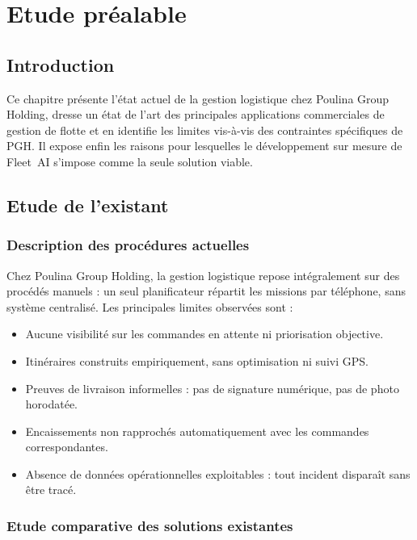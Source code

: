 \chapter{Etude préalable}

\section*{Introduction}
Ce chapitre présente l'état actuel de la gestion logistique chez Poulina Group Holding, dresse un état de l'art des principales applications commerciales de gestion de flotte et en identifie les limites vis-à-vis des contraintes spécifiques de PGH. Il expose enfin les raisons pour lesquelles le développement sur mesure de Fleet~AI s'impose comme la seule solution viable.

\section{Etude de l'existant}

\subsection{Description des procédures actuelles}

Chez Poulina Group Holding, la gestion logistique repose intégralement sur des procédés manuels : un seul planificateur répartit les missions par téléphone, sans système centralisé. Les principales limites observées sont :

\begin{itemize}
  \item Aucune visibilité sur les commandes en attente ni priorisation objective.
  \item Itinéraires construits empiriquement, sans optimisation ni suivi GPS.
  \item Preuves de livraison informelles : pas de signature numérique, pas de photo horodatée.
  \item Encaissements non rapprochés automatiquement avec les commandes correspondantes.
  \item Absence de données opérationnelles exploitables : tout incident disparaît sans être tracé.
\end{itemize}

\subsection{Etude comparative des solutions existantes}

